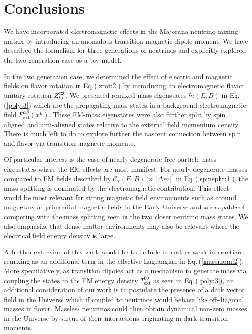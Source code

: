 \documentclass{ws-ijmpa}
\newcommand{\req}[1]{Eq.\,(\ref{#1})}
\begin{document}
\section{Conclusions}
\label{sec:conclusions}
We have incorporated electromagnetic effects in the Majorana neutrino mixing matrix by introducing an anomalous transition magnetic dipole moment. We have described the formalism for three generations of neutrinos and explicitly explored the two generation case as a toy model. 

In the two generation case, we determined the effect of electric and magnetic fields on flavor rotation in \req{zrot:2} by introducing an electromagnetic flavor unitary rotation $Z_{kj}^\mathrm{ext}$. We presented remixed mass eigenstates $\widetilde m(E,B)$ in \req{poly:3} which are the propagating mass-states in a background electromagnetic field $F^{\alpha\beta}_\mathrm{ext}(x^{\mu})$. These EM-mass eigenstates were also further split by spin aligned and anti-aligned states relative to the external field momentum density. There is much left to do to explore further the nascent connection between spin and flavor via transition magnetic moments. 

Of particular interest is the case of nearly degenerate free-particle mass eigenstates where the EM effects are most manifest. For nearly degenerate masses compared to EM fields described by $\mathcal{C}_{s}(E,B)\gg|\Delta m|^{2}$ in \req{spinsplit:1}, the mass splitting is dominated by the electromagnetic contribution. This effect would be most relevant for strong magnetic field environments such as around magnetars or primordial magnetic fields in the Early Universe and are capable of competing with the mass splitting seen in the two closer neutrino mass states. We also emphasize that dense matter environments may also be relevant where the electrical field energy density is large.

A further extension of this work would be to include in matter weak interaction remixing as an additional term in the effective Lagrangian in \req{massmom:2}. More speculatively, as transition dipoles act as a mechanism to generate mass via coupling the states to the EM energy density $T_\mathrm{ext}^{00}$ as seen in \req{poly:3}, an additional consideration of our work is to postulate the presence of a dark vector field in the Universe which if coupled to neutrinos would behave like off-diagonal masses in flavor. Massless neutrinos could then obtain dynamical non-zero masses in the Universe by virtue of their interactions originating in dark transition moments.
\end{document}
